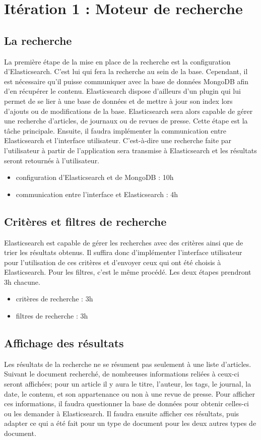 \section{Itération 1 : Moteur de recherche}

	\subsection{La recherche} 
		La première étape de la mise en place de la recherche est la configuration d'Elasticsearch. C'est lui qui fera la recherche au sein de la base. Cependant, il est nécessaire qu'il puisse communiquer avec la base de données MongoDB afin d'en récupérer le contenu. Elasticsearch dispose d'ailleurs d'un plugin qui lui permet de se lier à une base de données et de mettre à jour son index lors d'ajouts ou de modifications de la base. Elasticsearch sera alors capable de gérer une recherche d'articles, de journaux ou de revues de presse. Cette étape est la tâche principale. Ensuite, il faudra implémenter la communication entre Elasticsearch et l'interface utilisateur. C'est-à-dire une recherche faite par l'utilisateur à partir de l'application sera transmise à Elasticsearch et les résultats seront retournés à l'utilisateur.

		\begin{itemize}
			\item configuration d'Elasticsearch et de MongoDB : 10h
			\item communication entre l'interface et Elasticsearch : 4h
		\end{itemize}

	\subsection{Critères et filtres de recherche} 
		Elasticsearch est capable de gérer les recherches avec des critères ainsi que de trier les résultats obtenus. Il suffira donc d'implémenter l'interface utilisateur pour l'utilisation de ces critères et d'envoyer ceux qui ont été choisis à Elasticsearch. Pour les filtres, c'est le même procédé. Les deux étapes prendront 3h chacune.

		\begin{itemize}
			\item critères de recherche : 3h
			\item filtres de recherche : 3h
		\end{itemize}

	\subsection{Affichage des résultats} 
		Les résultats de la recherche ne se résument pas seulement à une liste d'articles. Suivant le document recherché, de nombreuses informations reliées à ceux-ci seront affichées; pour un article il y aura le titre, l'auteur, les tags, le journal, la date, le contenu, et son appartenance ou non à une revue de presse. Pour afficher ces informations, il faudra questionner la base de données pour obtenir celles-ci ou les demander à Elasticsearch. Il faudra ensuite afficher ces résultats, puis adapter ce qui a été fait pour un type de document pour les deux autres types de document.


